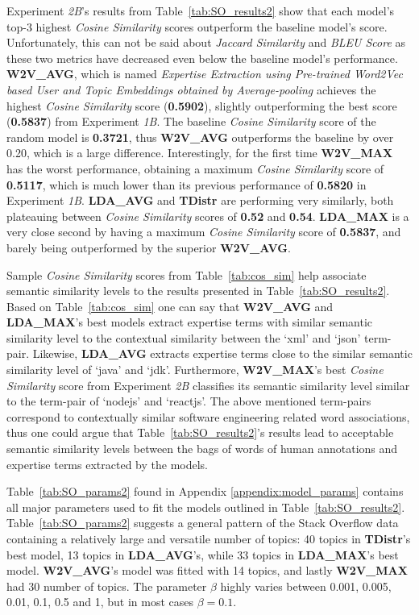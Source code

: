             Experiment \emph{2B}'s results from Table~\ref{tab:SO_results2} show that each model's top-$3$ highest \emph{Cosine Similarity} scores outperform the baseline model's score. Unfortunately, this can not be said about \emph{Jaccard Similarity} and \emph{BLEU Score} as these two metrics have decreased even below the baseline model's performance. \textbf{W2V\_AVG}, which is named \emph{Expertise Extraction using Pre-trained Word2Vec based User and Topic Embeddings obtained by Average-pooling} achieves the highest \emph{Cosine Similarity} score (\textbf{0.5902}), slightly outperforming the best score (\textbf{0.5837}) from Experiment \emph{1B}. The baseline \emph{Cosine Similarity} score of the random model is \textbf{0.3721}, thus \textbf{W2V\_AVG} outperforms the baseline by over 0.20, which is a large difference. Interestingly, for the first time \textbf{W2V\_MAX} has the worst performance, obtaining a maximum \emph{Cosine Similarity} score of \textbf{0.5117}, which is much lower than its previous performance of \textbf{0.5820} in Experiment \emph{1B}. \textbf{LDA\_AVG} and \textbf{TDistr} are performing very similarly, both plateauing between \emph{Cosine Similarity} scores of \textbf{0.52} and \textbf{0.54}. \textbf{LDA\_MAX} is a very close second by having a maximum \emph{Cosine Similarity} score of \textbf{0.5837}, and barely being outperformed by the superior \textbf{W2V\_AVG}.
            
            Sample \emph{Cosine Similarity} scores from Table~\ref{tab:cos_sim} help associate semantic similarity levels to the results presented in Table~\ref{tab:SO_results2}. Based on Table~\ref{tab:cos_sim} one can say that \textbf{W2V\_AVG} and \textbf{LDA\_MAX}'s best models extract expertise terms with similar semantic similarity level to the contextual similarity between the `xml' and `json' term-pair. Likewise, \textbf{LDA\_AVG} extracts expertise terms close to the similar semantic similarity level of `java' and `jdk'. Furthermore, \textbf{W2V\_MAX}'s best \emph{Cosine Similarity} score from Experiment \emph{2B} classifies its semantic similarity level similar to the term-pair of `nodejs' and `reactjs'. The above mentioned term-pairs correspond to contextually similar software engineering related word associations, thus one could argue that Table~\ref{tab:SO_results2}'s results lead to acceptable semantic similarity levels between the bags of words of human annotations and expertise terms extracted by the models.
            
            Table~\ref{tab:SO_params2} found in Appendix \ref{appendix:model_params} contains all major parameters used to fit the models outlined in Table~\ref{tab:SO_results2}. Table~\ref{tab:SO_params2} suggests a general pattern of the Stack Overflow data containing a relatively large and versatile number of topics: 40 topics in \textbf{TDistr}'s best model, 13 topics in \textbf{LDA\_AVG}'s, while 33 topics in \textbf{LDA\_MAX}'s best model. \textbf{W2V\_AVG}'s model was fitted with 14 topics, and lastly  \textbf{W2V\_MAX} had 30 number of topics. The parameter $\beta$ highly varies between 0.001, 0.005, 0.01, 0.1, 0.5 and 1, but in most cases $\beta=0.1$.
            
